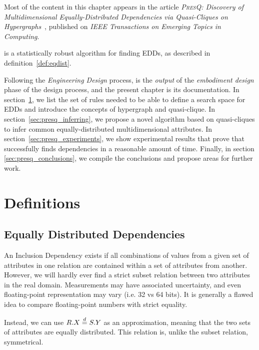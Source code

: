 \glsresetall

Most of the content in this chapter appears in the article
\emph{\textsc{PresQ}: Discovery of Multidimensional Equally-Distributed Dependencies via Quasi-Cliques on Hypergraphs}~\cite{AlvarezAyllonPresQ2022},
published on \emph{IEEE Transactions on Emerging Topics in Computing}.

\medskip

\PresQ is a statistically robust algorithm for finding \glspl{EDD}, as described
in definition~\ref{def:eqdist}.

Following the \emph{Engineering Design} process, \PresQ is the \emph{output} of
the \emph{embodiment design} phase of the design process, and the present chapter
is its documentation.
In section~\ref{sec:presq_definitions}, we list the set of rules needed to be able
to define a search space for \glspl{EDD} and introduce the concepts of
hypergraph and quasi-clique. In section~\ref{sec:presq_inferring}, we propose
a novel algorithm based on quasi-cliques to infer common equally-distributed
multidimensional attributes.
In section~\ref{sec:presq_experiments}, we show experimental results
that prove that \PresQ successfully finds dependencies in a reasonable amount of time.
Finally, in section \ref{sec:presq_conclusions}, we compile the conclusions and
propose areas for further work.

\section{Definitions}
\label{sec:presq_definitions}

\subsection{Equally Distributed Dependencies}
\label{sec:edd}
An Inclusion Dependency exists if all combinations of
values from a given set of attributes in one relation are contained within
a set of attributes from another.
However, we will hardly ever find a strict
subset relation between two attributes in the real domain. Measurements may have associated uncertainty,
and even floating-point representation may vary (i.e. 32 vs 64 bits). It is generally a
flawed idea to compare floating-point numbers with strict equality.

Instead, we can use $R.X \stackrel{d}{=} S.Y$ as an approximation, meaning that the two sets of
attributes are equally distributed. This relation is, unlike the subset relation, symmetrical.

